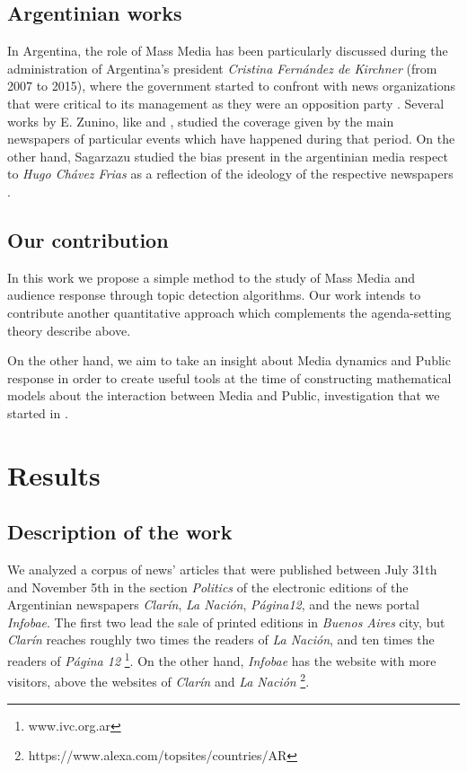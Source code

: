 \documentclass{bmcart}
\begin{document}
\subsection*{Argentinian works}

\par In Argentina, the role of Mass Media has been particularly discussed during the administration of Argentina’s president \emph{Cristina Fernández de Kirchner} (from 2007 to 2015), where the government started to confront with news organizations that were critical to its management as they were an opposition party \cite{mitchelstein2017information}. Several works by E. Zunino, like \cite{zunino2010cobertura} and \cite{koziner2013cobertura}, studied the coverage given by the main newspapers of particular events which have happened during that period.
On the other hand, Sagarzazu studied the bias present in the argentinian media respect to \emph{Hugo Chávez Frias} as a reflection of the ideology of the respective newspapers  \cite{sagarzazu2017hugo}.

\subsection*{Our contribution}

\par In this work we propose a simple method to the study of Mass Media and audience response through topic detection algorithms.
Our work intends to contribute another quantitative approach which complements the agenda-setting theory describe above.
\par On the other hand, we aim to take an insight about Media dynamics and Public response in order to create useful tools at the time of constructing mathematical models about the interaction between Media and Public, investigation that we started in \cite{pinto2016setting}.


\section*{Results}


\subsection*{Description of the work}
\label{sec:description}

\par We analyzed a corpus of news' articles that were published between July 31th and November 5th in the section \emph{Politics} of the electronic editions of the Argentinian newspapers \emph{Clarín}, \emph{La Nación}, \emph{Página12}, and the news portal \emph{Infobae}.
The first two lead the sale of printed editions in \emph{Buenos Aires} city, but \emph{Clarín} reaches roughly two times the readers of \emph{La Nación}, and ten times the readers of \emph{Página 12} \footnote{www.ivc.org.ar}. On the other hand, \emph{Infobae} has the website with more visitors, above the websites of \emph{Clarín} and \emph{La Nación} \footnote{https://www.alexa.com/topsites/countries/AR}.
\end{document}
